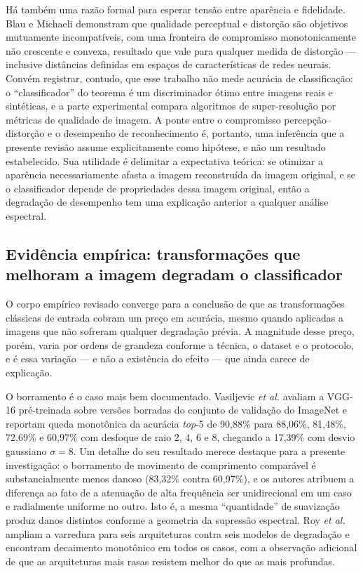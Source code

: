 \documentclass[conference]{IEEEtran}
\begin{document}
Há também uma razão formal para esperar tensão entre aparência e fidelidade.
Blau e Michaeli \cite{b3} demonstram que qualidade perceptual e distorção são
objetivos mutuamente incompatíveis, com uma fronteira de compromisso
monotonicamente não crescente e convexa, resultado que vale para qualquer
medida de distorção --- inclusive distâncias definidas em espaços de
características de redes neurais. Convém registrar, contudo, que esse trabalho
não mede acurácia de classificação: o ``classificador'' do teorema é um
discriminador ótimo entre imagens reais e sintéticas, e a parte experimental
compara algoritmos de super-resolução por métricas de qualidade de imagem. A
ponte entre o compromisso percepção--distorção e o desempenho de
reconhecimento é, portanto, uma inferência que a presente revisão assume
explicitamente como hipótese, e não um resultado estabelecido. Sua utilidade é
delimitar a expectativa teórica: se otimizar a aparência necessariamente afasta
a imagem reconstruída da imagem original, e se o classificador depende de
propriedades dessa imagem original, então a degradação de desempenho tem uma
explicação anterior a qualquer análise espectral.

\subsection{Evidência empírica: transformações que melhoram a imagem degradam o
classificador}

O corpo empírico revisado converge para a conclusão de que as transformações
clássicas de entrada cobram um preço em acurácia, mesmo quando aplicadas a
imagens que não sofreram qualquer degradação prévia. A magnitude desse preço,
porém, varia por ordens de grandeza conforme a técnica, o dataset e o protocolo,
e é essa variação --- e não a existência do efeito --- que ainda carece de
explicação.

O borramento é o caso mais bem documentado. Vasiljevic \textit{et al.}
\cite{b4} avaliam a VGG-16 pré-treinada sobre versões borradas do conjunto de
validação do ImageNet e reportam queda monotônica da acurácia \textit{top}-5 de
90,88\% para 88,06\%, 81,48\%, 72,69\% e 60,97\% com desfoque de raio 2, 4, 6 e
8, chegando a 17,39\% com desvio gaussiano $\sigma = 8$. Um detalhe do seu
resultado merece destaque para a presente investigação: o borramento de
movimento de comprimento comparável é substancialmente menos danoso (83,32\%
contra 60,97\%), e os autores atribuem a diferença ao fato de a atenuação de
alta frequência ser unidirecional em um caso e radialmente uniforme no outro.
Isto é, a mesma ``quantidade'' de suavização produz danos distintos conforme a
geometria da supressão espectral. Roy \textit{et al.} \cite{b5} ampliam a
varredura para seis arquiteturas contra seis modelos de degradação e encontram
decaimento monotônico em todos os casos, com a observação adicional de que as
arquiteturas mais rasas resistem melhor do que as mais profundas.
\end{document}
